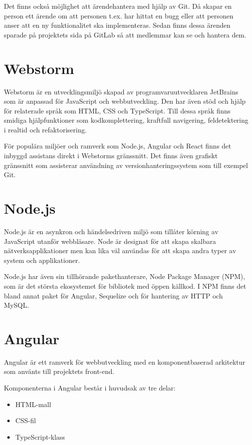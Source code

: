 Det finns också möjlighet att ärendehantera med hjälp av Git.
Då skapar en person ett ärende om att personen t.ex. har hittat en bugg eller att personen anser att en ny funktionalitet ska implementeras.
Sedan finns dessa ärenden sparade på projektets sida på GitLab så att medlemmar kan se och hantera dem. \cite{gitlab}

\section{Webstorm}
Webstorm är en utvecklingsmiljö skapad av programvaruutvecklaren JetBrains som är anpassad för JavaScript och webbutveckling. Den har även stöd och hjälp för relaterade språk som HTML, CSS och TypeScript. Till dessa språk finns smidiga hjälpfunktioner som kodkomplettering, kraftfull navigering, feldetektering i realtid och refaktorisering.

För populära miljöer och ramverk som Node.js, Angular och React finns det inbyggd assistans direkt i Webstorms gränssnitt. Det finns även grafiskt gränssnitt som assisterar användning av versionhanteringssystem som till exempel Git.\cite{webstorm}
\section{Node.js}
Node.js är en asynkron och händelsedriven miljö som tillåter körning av JavaScript utanför webbläsare. Node är designat för att skapa skalbara nätverksapplikationer men kan lika väl användas för att skapa andra typer av system och applikationer. \cite{nodejs}

Node.js har även sin tillhörande pakethanterare, Node Package Manager (NPM), som är det största ekosystemet för bibliotek med öppen källkod. \cite{npm}
I NPM finns det bland annat paket för Angular, Sequelize och för hantering av HTTP och MySQL.

\section{Angular}
Angular är ett ramverk för webbutveckling med en komponentbaserad arkitektur som använts till projektets front-end.

Komponenterna i Angular består i huvudsak av tre delar:

\begin{itemize}
\item HTML-mall
\item CSS-fil
\item TypeScript-klass
\end{itemize}

